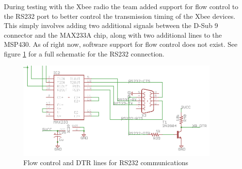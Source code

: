 During testing with the Xbee radio the team added support for flow control to the RS232 port to better control the transmission timing of the Xbee devices. This simply involves adding two additional signals between the D-Sub 9 connector and the MAX233A chip, along with two additional lines to the MSP430. As of right now, software support for flow control does not exist. See figure \ref{fig:rs232_flow} for a full schematic for the \ac{RS232} connection.
\begin{figure}[htbp]
  \centering
  \includegraphics[width=4in]{includes/Complete_RS232_DTR}
  \caption{Flow control and DTR lines for RS232 communications}
  \label{fig:rs232_flow}
\end{figure}

